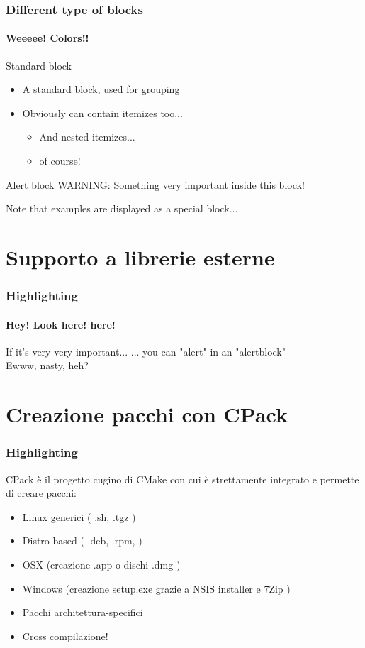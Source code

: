 \documentclass[12pt]{beamer}
\begin{document}
\begin{frame}
  \frametitle{Different type of blocks}
  \framesubtitle{Weeeee! Colors!!}
  \begin{block}{Standard block}
  \begin{itemize}
    \item A standard block, used for grouping
    \item Obviously can contain itemizes too...
    \begin{itemize}
      \item And nested itemizes...
      \item of course!
    \end{itemize}
  \end{itemize}
  \end{block}
  \begin{alertblock}{Alert block}
  WARNING: Something very important inside this block!
  \end{alertblock}
  \begin{example}
  Note that examples are displayed as a special block...
  \end{example}
\end{frame}

\section{Supporto a librerie esterne}
\begin{frame}
  \frametitle{Highlighting}
  \framesubtitle{Hey! Look here! here!}


  \begin{alertblock}{If it's very very important...}
  \alert{... you can "alert" in an "alertblock"}\\
  Ewww, nasty, heh?
  \end{alertblock}
\end{frame}

\section{Creazione pacchi con CPack}
\begin{frame}
  \frametitle{Highlighting}
CPack è il progetto cugino di CMake con cui è strettamente integrato e permette di creare pacchi:
\begin{itemize}
	\item Linux generici ( .sh, .tgz )
	\item Distro-based ( .deb, .rpm, )
	\item OSX (creazione .app o dischi .dmg )
	\item Windows (creazione setup.exe grazie a NSIS installer e 7Zip )
\end{itemize}
\begin{itemize}
	\item Pacchi architettura-specifici
	\item Cross compilazione!
\end{itemize}

\end{frame}
\end{document}
